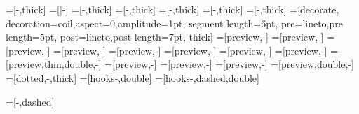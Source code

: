 \usetikzlibrary{decorations,decorations.pathmorphing,decorations.markings}
=[-\@mmtarrowtip,thick] 
=[|-\@mmtarrowtip] %
=[-\@mmtarrowtip,thick]
=[\@mmtarrowtipmonoright-\@mmtarrowtip,thick]
=[\@mmtarrowtipmonoright-\@mmtarrowtippartial,thick]
=[\@mmtarrowtipmonoleft-\@mmtarrowtip,thick]
=[\@mmtarrowtipmonoleft-\@mmtarrowtippartialleft,thick]
=[decorate,
                                decoration={coil,aspect=0,amplitude=1pt,
                                                    segment length=6pt,
                                                    pre=lineto,pre length=5pt,
                                                    post=lineto,post length=7pt},
                                thick]
=[preview,-\@mmtarrowtip]
=[preview,\@mmtarrowtipmonoright-\@mmtarrowtip]
=[preview,-\@mmtarrowtippartial]
=[preview,\@mmtarrowtipmonoright-\@mmtarrowtippartial]
=[preview,-\@mmtarrowtip]
=[preview,\@mmtarrowtipmonoleft-\@mmtarrowtip]
=[preview,-\@mmtarrowtippartialleft]
=[preview,\@mmtarrowtipmonoleft-\@mmtarrowtippartialleft]
=[preview,thin,double,-\@mmtarrowtip]
=[preview,\@mmtreversearrowtip-\@mmtarrowtip]
=[preview,\@mmtreversearrowtippartial-\@mmtarrowtippartial]
=[preview,\@mmtreversearrowtippartialleft-\@mmtarrowtippartialleft]
=[preview,double,-\@mmtarrowtip]
=[dotted,-\@mmtarrowtip,thick]
=[hooks-\@mmtarrowtip,double] 
=[hooks-\@mmtarrowtip,dashed,double] 


=[\@mmtarrowtip-\@mmtarrowtip,dashed]

\newcommand\mmtthy[3]{\def\@test{#3}%
\begin{array}{l}\textsf{#1}\\\hline #2\ifx\@test\@empty\else\\\hline #3\fi\end{array}}
\newcommand\mmtar[2][]{\raisebox{.5ex}{\tikz[#1]{\draw[#2] (0,0) -- (.6,0);}}}
\newcommand\nmmtar[3][]{\raisebox{.4ex}{\tikz[#1]{\draw[#2] (0,0) --
      node[above]{\ensuremath{\scriptstyle #3}} (.8,0);}}}
